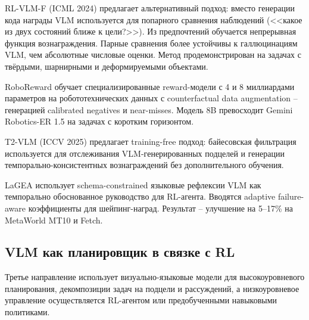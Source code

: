     RL-VLM-F \cite{wang2024rlvlmf} (ICML 2024) предлагает альтернативный подход: вместо генерации кода награды VLM используется для попарного сравнения наблюдений (<<какое из двух состояний ближе к цели?>>). Из предпочтений обучается непрерывная функция вознаграждения. Парные сравнения более устойчивы к галлюцинациям VLM, чем абсолютные числовые оценки. Метод продемонстрирован на задачах с твёрдыми, шарнирными и деформируемыми объектами.

    RoboReward \cite{roboreward2025} обучает специализированные reward-модели с 4 и 8 миллиардами параметров на робототехнических данных с counterfactual data augmentation -- генерацией calibrated negatives и near-misses. Модель 8B превосходит Gemini Robotics-ER 1.5 на задачах с коротким горизонтом.

    T2-VLM \cite{zhao2025t2vlm} (ICCV 2025) предлагает training-free подход: байесовская фильтрация используется для отслеживания VLM-генерированных подцелей и генерации темпорально-консистентных вознаграждений без дополнительного обучения.

    LaGEA \cite{lagea2025} использует schema-constrained языковые рефлексии VLM как темпорально обоснованное руководство для RL-агента. Вводятся adaptive failure-aware коэффициенты для шейпинг-наград. Результат -- улучшение на 5--17\% на MetaWorld MT10 и Fetch.

\subsection{VLM как планировщик в связке с RL}
\label{subsec:vlm-planner}

    Третье направление использует визуально-языковые модели для высокоуровневого планирования, декомпозиции задач на подцели и рассуждений, а низкоуровневое управление осуществляется RL-агентом или предобученными навыковыми политиками.


